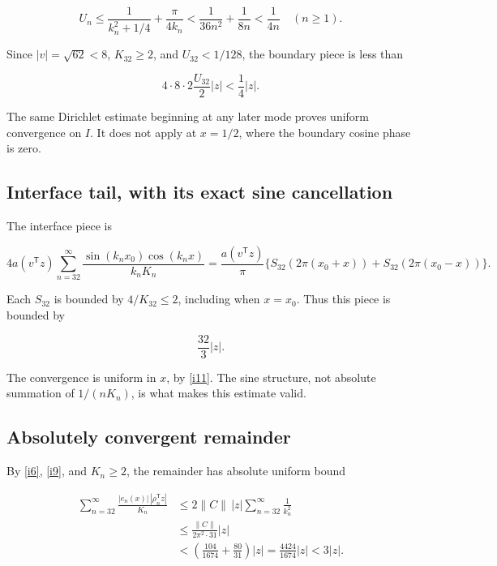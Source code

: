 \documentclass[11pt]{article}
\begin{document}
\[
 U_n\le\frac1{k_n^2+1/4}+\frac\pi{4k_n}
 <\frac1{36n^2}+\frac1{8n}<\frac1{4n}\quad(n\ge1).
\]

Since \(|v|=\sqrt{62}<8\), \(K_{32}\ge2\), and \(U_{32}<1/128\), the boundary piece is less than

\begin{equation}\label{i13}
4\cdot8\cdot2\frac{U_{32}}2|z|<\frac14|z|.
\end{equation}

The same Dirichlet estimate beginning at any later mode proves uniform convergence on \(I\). It does not apply at \(x=1/2\), where the boundary cosine phase is zero.

\subsection{Interface tail, with its exact sine cancellation}

The interface piece is

\begin{equation}\label{i14}
4a(v^{\mathsf T}z)\sum_{n=32}^{\infty}
       \frac{\sin(k_nx_0)\cos(k_nx)}{k_nK_n}
 =\frac{a(v^{\mathsf T}z)}\pi
   \{S_{32}(2\pi(x_0+x))+S_{32}(2\pi(x_0-x))\}.
\end{equation}

Each \(S_{32}\) is bounded by \(4/K_{32}\le2\), including when \(x=x_0\). Thus this piece is bounded by

\begin{equation}\label{i15}
\frac{32}3|z|.
\end{equation}

The convergence is uniform in \(x\), by \eqref{i11}. The sine structure, not absolute summation of \(1/(nK_n)\), is what makes this estimate valid.

\subsection{Absolutely convergent remainder}

By \eqref{i6}, \eqref{i9}, and \(K_n\ge2\), the remainder has absolute uniform bound

\begin{equation}\label{i16}
\begin{split}
 \sum_{n=32}^{\infty}\frac{|e_n(x)|\,|\rho_n^{\mathsf T}z|}{K_n}
 &\le2\|C\|\,|z|\sum_{n=32}^{\infty}\frac1{k_n^2}\\
 &\le\frac{\|C\|}{2\pi^2\cdot31}|z|\\
 &<\left(\frac{104}{1674}+\frac{80}{31}\right)|z|
 =\frac{4424}{1674}|z|<3|z|.
 \end{split}
\end{equation}
\end{document}
